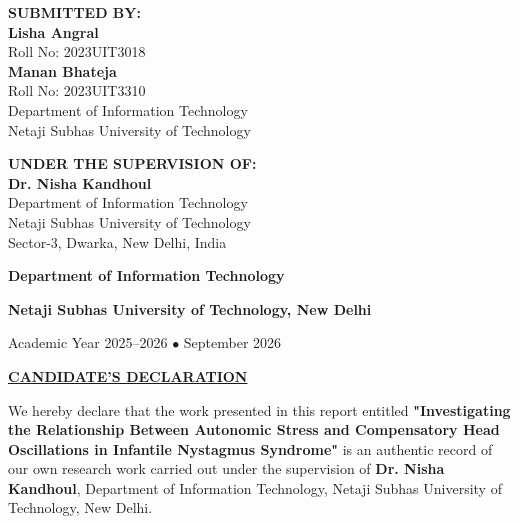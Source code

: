 \documentclass[12pt,a4paper,oneside]{report}
\begin{document}
\begin{titlepage}
    \begin{minipage}[t]{0.48\textwidth}
        \flushleft
        \textbf{\small SUBMITTED BY:}\\[0.15cm]
        {\bfseries\normalsize Lisha Angral}\\[0.05cm]
        {\small Roll No: 2023UIT3018}\\[0.25cm]
        {\bfseries\normalsize Manan Bhateja}\\[0.05cm]
        {\small Roll No: 2023UIT3310}\\[0.35cm]
        {\footnotesize Department of Information Technology\\
        Netaji Subhas University of Technology}
    \end{minipage}
    \hfill
    \begin{minipage}[t]{0.48\textwidth}
        \flushright
        \textbf{\small UNDER THE SUPERVISION OF:}\\[0.15cm]
        {\bfseries\normalsize Dr. Nisha Kandhoul}\\[0.1cm]
        {\small Department of Information Technology}\\[0.35cm]
        {\footnotesize Netaji Subhas University of Technology\\
        Sector-3, Dwarka, New Delhi, India}
    \end{minipage}
    
    \vfill
    {\normalsize\bfseries Department of Information Technology\par}
    {\normalsize\bfseries Netaji Subhas University of Technology, New Delhi\par}
    \vspace{0.15cm}
    {\small Academic Year 2025--2026 \quad $\bullet$ \quad September 2026\par}
\end{titlepage}

\cleardoublepage
\thispagestyle{plain}
\begin{center}
    {\large\bfseries\underline{CANDIDATE'S DECLARATION}\par}
\end{center}

\vspace{0.8cm}
\noindent We hereby declare that the work presented in this report entitled \textbf{"Investigating the Relationship Between Autonomic Stress and Compensatory Head Oscillations in Infantile Nystagmus Syndrome"} is an authentic record of our own research work carried out under the supervision of \textbf{Dr. Nisha Kandhoul}, Department of Information Technology, Netaji Subhas University of Technology, New Delhi.
\end{document}
